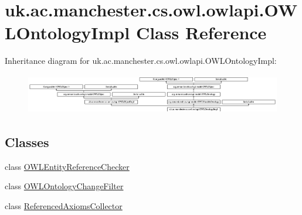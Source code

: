 \hypertarget{classuk_1_1ac_1_1manchester_1_1cs_1_1owl_1_1owlapi_1_1_o_w_l_ontology_impl}{\section{uk.\-ac.\-manchester.\-cs.\-owl.\-owlapi.\-O\-W\-L\-Ontology\-Impl Class Reference}
\label{classuk_1_1ac_1_1manchester_1_1cs_1_1owl_1_1owlapi_1_1_o_w_l_ontology_impl}
}
Inheritance diagram for uk.\-ac.\-manchester.\-cs.\-owl.\-owlapi.\-O\-W\-L\-Ontology\-Impl\-:\begin{figure}[H]
\begin{center}
\leavevmode
\includegraphics[height=1.750000cm]{classuk_1_1ac_1_1manchester_1_1cs_1_1owl_1_1owlapi_1_1_o_w_l_ontology_impl}
\end{center}
\end{figure}
\subsection*{Classes}
\begin{DoxyCompactItemize}
\item 
class \hyperlink{classuk_1_1ac_1_1manchester_1_1cs_1_1owl_1_1owlapi_1_1_o_w_l_ontology_impl_1_1_o_w_l_entity_reference_checker}{O\-W\-L\-Entity\-Reference\-Checker}
\item 
class \hyperlink{classuk_1_1ac_1_1manchester_1_1cs_1_1owl_1_1owlapi_1_1_o_w_l_ontology_impl_1_1_o_w_l_ontology_change_filter}{O\-W\-L\-Ontology\-Change\-Filter}
\item 
class \hyperlink{classuk_1_1ac_1_1manchester_1_1cs_1_1owl_1_1owlapi_1_1_o_w_l_ontology_impl_1_1_referenced_axioms_collector}{Referenced\-Axioms\-Collector}
\end{DoxyCompactItemize}
